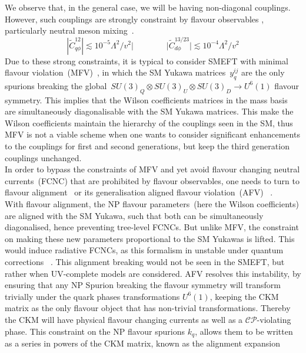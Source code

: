 We observe that, in the general case, we will be having non-diagonal couplings. However, such couplings are strongly constraint by flavour observables , particularly neutral meson mixing~\cite{Blankenburg:2012ex}.
\begin{equation}
|\tilde{C}_{q\phi}^{12}| \lesssim 10^{-5} \Lambda^2/v^2| \quad \quad  \quad \quad | \tilde{C}_{d\phi}^{13/23}| \lesssim 10^{-4} \Lambda^2/v^2
	\end{equation}
 Due to these strong constraints, it is typical to consider SMEFT with minimal flavour violation~(MFV)~\cite{DAmbrosio:2002vsn}, in which the SM Yukawa matrices~$y_q^{ij}$ are the only spurions breaking the global~$SU(3)_Q \otimes SU(3)_U \otimes SU(3)_D \to U^6(1)$ flavour symmetry. This implies that the Wilson coefficients matrices in the mass basis are simultaneously diagonalisable with the SM Yukawa matrices. This make the Wilson coefficients maintain the hierarchy of the couplings seen in the SM, thus MFV is not a viable scheme when one wants to consider significant enhancements to the couplings for first and second generations, but keep the third generation couplings unchanged. \\ In order to bypass the constraints of MFV and yet avoid flavour changing neutral currents~(FCNC) that are prohibited by flavour observables, one needs to turn to  flavour alignment~\cite{Pich:2009sp,Pich:2010ic} or its generalisation aligned flavour violation~(AFV)~\cite{Egana-Ugrinovic:2018znw} . \\ 
 With flavour alignment, the NP flavour parameters~(here the Wilson coefficients) are aligned with the SM Yukawa, such that both can be simultaneously diagonalised, hence preventing tree-level FCNCs. But unlike MFV, the constraint on making these new parameters proportional to the SM Yukawas is lifted.  This would induce radiative FCNCs, as this formalism in unstable under quantum corrections ~\cite{Ferreira:2010xe,Jung:2010ik,Botella:2015yfa}. This alignment breaking would not be seen in the SMEFT, but rather when UV-complete models are considered. AFV resolves this instability, by ensuring that any NP Spurion breaking the flavour symmetry will transform trivially under the quark phases transformations $ U^6(1)$, keeping the CKM matrix as the only flavour object that has non-trivial transformations. Thereby the CKM will have physical flavour changing currents as well as a $\mathcal{CP}$-violating phase. This constraint on the NP flavour spurions $k_q$, allows them to be written as a series in powers of the CKM matrix, known as the alignment expansion

